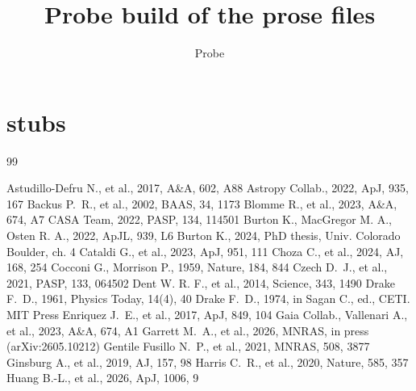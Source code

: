 \documentclass[twocolumn,twocolappendix]{openjournal}
\begin{document}
\title{Probe build of the prose files}
\author{Probe}
%
%
\section*{stubs}\label{sec:statistic}\label{sec:sample}\label{sec:background}\label{sec:heldout}\label{app:falsealarm}\label{tab:ledger}
%
%
\begin{thebibliography}{99}

 Astudillo-Defru N., et al., 2017, A\&A, 602, A88
 Astropy Collab., 2022, ApJ, 935, 167
 Backus P.~R., et al., 2002, BAAS, 34, 1173
 Blomme R., et al., 2023, A\&A, 674, A7
 CASA Team, 2022, PASP, 134, 114501
 Burton K., MacGregor M. A., Osten R. A., 2022, ApJL, 939, L6
 Burton K., 2024, PhD thesis, Univ. Colorado Boulder, ch. 4
 Cataldi G., et al., 2023, ApJ, 951, 111
 Choza C., et al., 2024, AJ, 168, 254
 Cocconi G., Morrison P., 1959, Nature, 184, 844
 Czech D.~J., et al., 2021, PASP, 133, 064502
 Dent W. R. F., et al., 2014, Science, 343, 1490
 Drake F.~D., 1961, Physics Today, 14(4), 40
 Drake F.~D., 1974, in Sagan C., ed., CETI. MIT Press
 Enriquez J.~E., et al., 2017, ApJ, 849, 104
 Gaia Collab., Vallenari A., et al., 2023, A\&A, 674, A1
 Garrett M.~A., et al., 2026, MNRAS, in press (arXiv:2605.10212)
 Gentile Fusillo N.~P., et al., 2021, MNRAS, 508, 3877
 Ginsburg A., et al., 2019, AJ, 157, 98
 Harris C.~R., et al., 2020, Nature, 585, 357
 Huang B.-L., et al., 2026, ApJ, 1006, 9

\end{thebibliography}
\end{document}
